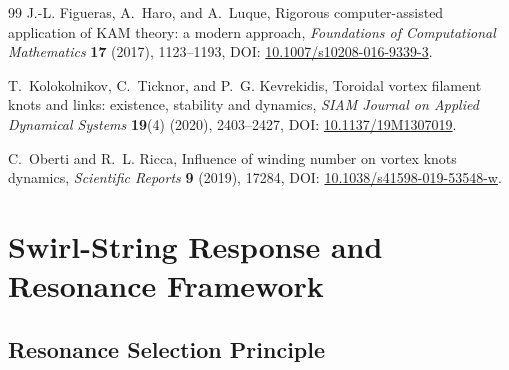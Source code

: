 \begin{thebibliography}{99}
J.-L. Figueras, A.~Haro, and A.~Luque,
\newblock Rigorous computer-assisted application of KAM theory: a modern approach,
\newblock \emph{Foundations of Computational Mathematics} \textbf{17} (2017), 1123--1193,
\newblock DOI: \href{https://doi.org/10.1007/s10208-016-9339-3}{10.1007/s10208-016-9339-3}.

T.~Kolokolnikov, C.~Ticknor, and P.~G. Kevrekidis,
\newblock Toroidal vortex filament knots and links: existence, stability and dynamics,
\newblock \emph{SIAM Journal on Applied Dynamical Systems} \textbf{19}(4) (2020), 2403--2427,
\newblock DOI: \href{https://doi.org/10.1137/19M1307019}{10.1137/19M1307019}.

C.~Oberti and R.~L. Ricca,
\newblock Influence of winding number on vortex knots dynamics,
\newblock \emph{Scientific Reports} \textbf{9} (2019), 17284,
\newblock DOI: \href{https://doi.org/10.1038/s41598-019-53548-w}{10.1038/s41598-019-53548-w}.

\end{thebibliography}
\fi



\providecommand{\vswirl}{\mathbf{v}_{\!\boldsymbol{\circlearrowleft}}}
\providecommand{\vnorm}{\lVert \mathbf{v}_{\!\boldsymbol{\circlearrowleft}}\rVert}
\providecommand{\rhoF}{\rho_{\!f}}
\providecommand{\rhoE}{\rho_{\!E}}
\providecommand{\rhoM}{\rho_{\!m}}
\providecommand{\rhocore}{\rho_{\text{core}}}
\providecommand{\rc}{r_c}
\providecommand{\omC}{\omega_C}
\providecommand{\Fswirlmax}{F_{\text{swirl}}^{\max}}


\section{Swirl-String Response and Resonance Framework}

\subsection{Resonance Selection Principle}
    \label{sec:resonance-selection-principle}
    
